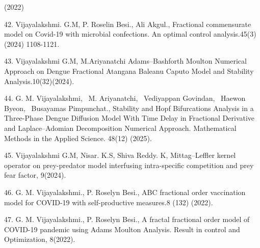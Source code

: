 \documentclass[10pt]{NSP1}
\begin{document}
\par\medskip{}\smallskip

(2022)

42. Vijayalakshmi. G.M, P. Roselin Besi., Ali Akgul., Fractional commensurate model on Covid-19 with microbial confections. An optimal control analysis.45(3) (2024) 1108-1121.

43. Vijayalakshmi G.M, M.Ariyanatchi Adams–Bashforth Moulton Numerical Approach on Dengue Fractional Atangana Baleanu Caputo Model and Stability Analysis.10(32)(2024).

44. G. M. Vijayalakshmi,  M. Ariyanatchi,  Vediyappan Govindan,  Haewon Byeon,  Busayamas Pimpunchat., Stability and Hopf Bifurcations Analysis in a Three-Phase Dengue Diffusion Model With Time Delay in Fractional Derivative and Laplace–Adomian Decomposition Numerical Approach. Mathematical Methods in the Applied Science. 48(12) (2025).

45. Vijayalakshmi G.M, Nisar. K.S, Shiva Reddy. K, Mittag–Leffler kernel operator on prey-predator model interfusing intra-specific competition and prey fear factor, 9(2024).

46. G. M. Vijayalakshmi., P. Roselyn Besi., ABC fractional order vaccination model for COVID-19 with self-productive measures.8 (132) (2022).

47. G. M. Vijayalakshmi., P. Roselyn Besi., A fractal fractional order model of COVID-19 pandemic using Adams Moulton Analysis. Result in control and Optimization, 8(2022).
\end{document}
